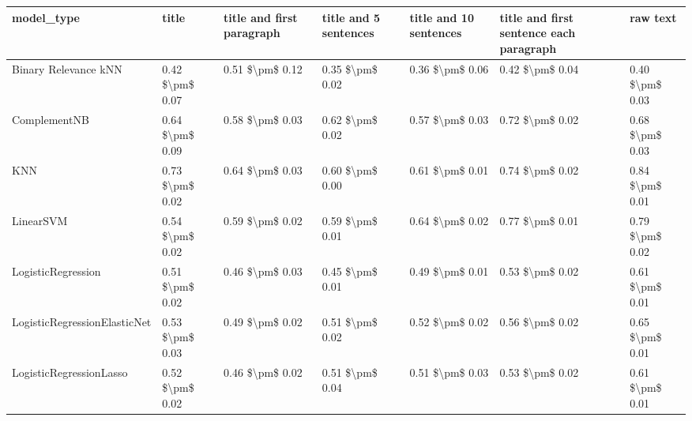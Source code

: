 \begin{tabular}{lllllll}
\toprule
                     model\_type &               title & title and first paragraph & title and 5 sentences & title and 10 sentences & title and first sentence each paragraph &        raw text \\
\midrule
           Binary Relevance kNN &     0.42 \$\textbackslash pm\$ 0.07 &           0.51 \$\textbackslash pm\$ 0.12 &       0.35 \$\textbackslash pm\$ 0.02 &        0.36 \$\textbackslash pm\$ 0.06 &                         0.42 \$\textbackslash pm\$ 0.04 & 0.40 \$\textbackslash pm\$ 0.03 \\
                   ComplementNB &     0.64 \$\textbackslash pm\$ 0.09 &           0.58 \$\textbackslash pm\$ 0.03 &       0.62 \$\textbackslash pm\$ 0.02 &        0.57 \$\textbackslash pm\$ 0.03 &                         0.72 \$\textbackslash pm\$ 0.02 & 0.68 \$\textbackslash pm\$ 0.03 \\
                            KNN &     0.73 \$\textbackslash pm\$ 0.02 &           0.64 \$\textbackslash pm\$ 0.03 &       0.60 \$\textbackslash pm\$ 0.00 &        0.61 \$\textbackslash pm\$ 0.01 &                         0.74 \$\textbackslash pm\$ 0.02 & 0.84 \$\textbackslash pm\$ 0.01 \\
                      LinearSVM &     0.54 \$\textbackslash pm\$ 0.02 &           0.59 \$\textbackslash pm\$ 0.02 &       0.59 \$\textbackslash pm\$ 0.01 &        0.64 \$\textbackslash pm\$ 0.02 &                         0.77 \$\textbackslash pm\$ 0.01 & 0.79 \$\textbackslash pm\$ 0.02 \\
             LogisticRegression &     0.51 \$\textbackslash pm\$ 0.02 &           0.46 \$\textbackslash pm\$ 0.03 &       0.45 \$\textbackslash pm\$ 0.01 &        0.49 \$\textbackslash pm\$ 0.01 &                         0.53 \$\textbackslash pm\$ 0.02 & 0.61 \$\textbackslash pm\$ 0.01 \\
   LogisticRegressionElasticNet &     0.53 \$\textbackslash pm\$ 0.03 &           0.49 \$\textbackslash pm\$ 0.02 &       0.51 \$\textbackslash pm\$ 0.02 &        0.52 \$\textbackslash pm\$ 0.02 &                         0.56 \$\textbackslash pm\$ 0.02 & 0.65 \$\textbackslash pm\$ 0.01 \\
        LogisticRegressionLasso &     0.52 \$\textbackslash pm\$ 0.02 &           0.46 \$\textbackslash pm\$ 0.02 &       0.51 \$\textbackslash pm\$ 0.04 &        0.51 \$\textbackslash pm\$ 0.03 &                         0.53 \$\textbackslash pm\$ 0.02 & 0.61 \$\textbackslash pm\$ 0.01 \\

\end{tabular}
